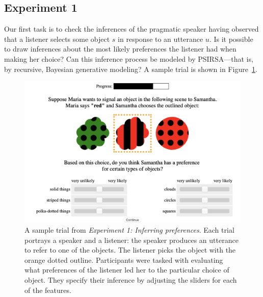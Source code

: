\documentclass[10pt,a4paper]{article}
\begin{document}






\subsection*{Experiment 1}
Our first task is to check the inferences of the pragmatic speaker having observed that a listener selects some object $s$ in response to an utterance $u$. 
Is it possible to draw inferences about the most likely preferences the listener had when making her choice? 
Can this inference process be modeled by PSIRSA---that is, by recursive, Bayesian generative modeling?
A sample trial is shown in Figure~\ref{exp1-trial}.

\begin{figure}[ht!]
	\centering
	\includegraphics[width=4.5in]{images/preference-trial.png}
	\caption{ \small{A sample trial from \emph{Experiment 1: Inferring preferences}. Each trial portrays a speaker and a listener: the speaker produces an utterance to refer to one of the objects. The listener picks the object with the orange dotted outline. Participants were tasked with evaluating what preferences of the listener led her to the particular choice of object. They specify their inference by adjusting the sliders for each of the features}.}\label{exp1-trial}
\end{figure}
\end{document}

